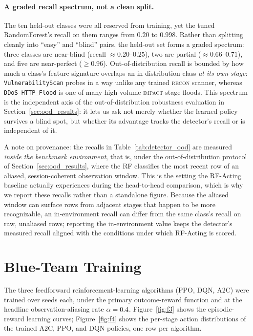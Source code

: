 \paragraph{A graded recall spectrum, not a clean split.} The ten held-out classes were all reserved from training, yet the tuned RandomForest's recall on them ranges from $0.20$ to $0.998$. Rather than splitting cleanly into ``easy'' and ``blind'' pairs, the held-out set forms a graded spectrum: three classes are near-blind (recall $\approx 0.20$--$0.25$), two are partial ($\approx 0.66$--$0.71$), and five are near-perfect ($\geq 0.96$). Out-of-distribution recall is bounded by how much a class's feature signature overlaps an in-distribution class \emph{at its own stage}: \texttt{VulnerabilityScan} probes in a way unlike any trained \textsc{recon} scanner, whereas \texttt{DDoS-HTTP\_Flood} is one of many high-volume \textsc{impact}-stage floods. This spectrum is the independent axis of the out-of-distribution robustness evaluation in Section~\ref{sec:ood_results}: it lets us ask not merely whether the learned policy survives a blind spot, but whether its advantage tracks the detector's recall or is independent of it.

A note on provenance: the recalls in Table~\ref{tab:detector_ood} are measured \emph{inside the benchmark environment}, that is, under the out-of-distribution protocol of Section~\ref{sec:ood_results}, where the RF classifies the most recent row of an aliased, session-coherent observation window. This is the setting the RF-Acting baseline actually experiences during the head-to-head comparison, which is why we report these recalls rather than a standalone figure. Because the aliased window can surface rows from adjacent stages that happen to be more recognizable, an in-environment recall can differ from the same class's recall on raw, unaliased rows; reporting the in-environment value keeps the detector's measured recall aligned with the conditions under which RF-Acting is scored.

\clearpage
\section{Blue-Team Training}\label{sec:blue_team_results}
The three feedforward reinforcement-learning algorithms (PPO, DQN, A2C) were trained over \NumSeeds{} seeds each, under the primary outcome-reward function and at the headline observation-aliasing rate $\alpha = 0.4$. Figure~\ref{fig:f3} shows the episodic-reward learning curves; Figure~\ref{fig:f4} shows the per-stage action distributions of the trained A2C, PPO, and DQN policies, one row per algorithm.

